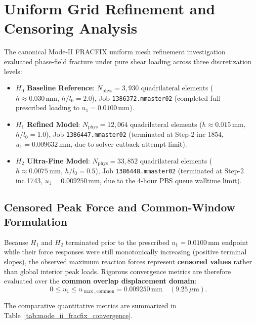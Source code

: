 \section{Uniform Grid Refinement and Censoring Analysis}
\label{sec:topo_uniform_convergence}

The canonical Mode-II FRACFIX uniform mesh refinement investigation evaluated phase-field fracture under pure shear loading across three discretization levels:
\begin{itemize}
    \item \textbf{$H_0$ Baseline Reference}: $N_{\text{phys}} = 3,930$ quadrilateral elements ($h \approx 0.030\,\text{mm}$, $h/l_0 = 2.0$), Job \texttt{1386372.mmaster02} (completed full prescribed loading to $u_1 = 0.0100\,\text{mm}$).
    \item \textbf{$H_1$ Refined Model}: $N_{\text{phys}} = 12,064$ quadrilateral elements ($h \approx 0.015\,\text{mm}$, $h/l_0 = 1.0$), Job \texttt{1386447.mmaster02} (terminated at Step-2 inc 1854, $u_1 = 0.009632\,\text{mm}$, due to solver cutback attempt limit).
    \item \textbf{$H_2$ Ultra-Fine Model}: $N_{\text{phys}} = 33,852$ quadrilateral elements ($h \approx 0.0075\,\text{mm}$, $h/l_0 = 0.5$), Job \texttt{1386448.mmaster02} (terminated at Step-2 inc 1743, $u_1 = 0.009250\,\text{mm}$, due to the 4-hour PBS queue walltime limit).
\end{itemize}

\subsection{Censored Peak Force and Common-Window Formulation}
Because $H_1$ and $H_2$ terminated prior to the prescribed $u_1 = 0.0100\,\text{mm}$ endpoint while their force responses were still monotonically increasing (positive terminal slopes), the observed maximum reaction forces represent \textbf{censored values} rather than global interior peak loads. Rigorous convergence metrics are therefore evaluated over the \textbf{common overlap displacement domain}:
\begin{equation}
\label{eq:common_window_domain_a}
0 \le u_1 \le u_{\max,\mathrm{common}} = 0.009250\,\text{mm} \quad (9.25\,\mu\text{m}).
\end{equation}

The comparative quantitative metrics are summarized in Table~\ref{tab:mode_ii_fracfix_convergence}.

